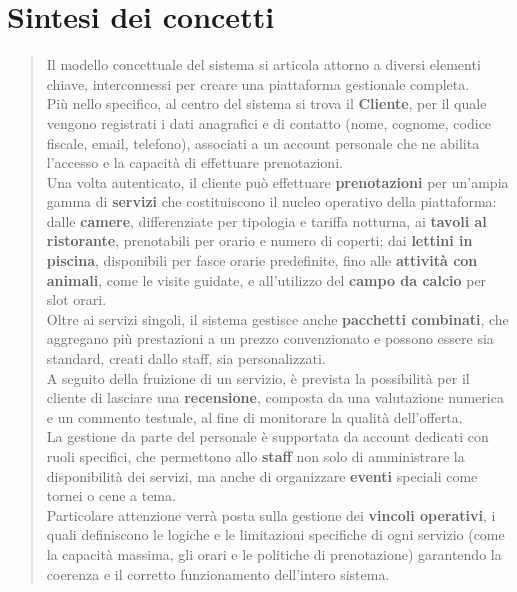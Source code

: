 \documentclass[a4paper,11pt]{report}
\begin{document}
\section{Sintesi dei concetti}
\begin{quote}
Il modello concettuale del sistema si articola attorno a diversi elementi chiave, interconnessi 
per creare una piattaforma gestionale completa. \\[6pt]
Più nello specifico, al centro del sistema si trova il \textbf{Cliente}, per il quale vengono registrati i dati anagrafici e di contatto 
(nome, cognome, codice fiscale, email, telefono), associati a un account personale che ne abilita l'accesso e 
la capacità di effettuare prenotazioni. \\[6pt]
Una volta autenticato, il cliente può effettuare \textbf{prenotazioni} per un'ampia gamma di \textbf{servizi} 
che costituiscono il nucleo operativo della piattaforma: dalle \textbf{camere}, differenziate per tipologia 
e tariffa notturna, ai \textbf{tavoli al ristorante}, prenotabili per orario e numero di coperti; 
dai \textbf{lettini in piscina}, disponibili per fasce orarie predefinite, fino alle \textbf{attività con animali}, 
come le visite guidate, e all'utilizzo del \textbf{campo da calcio} per slot orari. \\[6pt]
Oltre ai servizi singoli, il sistema gestisce anche \textbf{pacchetti combinati}, 
che aggregano più prestazioni a un prezzo convenzionato e possono essere sia standard, 
creati dallo staff, sia personalizzati. \\[6pt]
A seguito della fruizione di un servizio, è prevista la possibilità per il cliente di lasciare una \textbf{recensione},
composta da una valutazione numerica e un commento testuale, al fine di monitorare la qualità dell'offerta. \\[6pt]
La gestione da parte del personale è supportata da account dedicati con ruoli specifici,
che permettono allo \textbf{staff} non solo di amministrare la disponibilità dei servizi, 
ma anche di organizzare \textbf{eventi} speciali come tornei o cene a tema. \\[6pt]
Particolare attenzione verrà posta sulla gestione dei \textbf{vincoli operativi}, 
i quali definiscono le logiche e le limitazioni specifiche di ogni servizio (come la capacità massima, gli orari e le politiche di prenotazione) garantendo la coerenza e il corretto funzionamento dell'intero sistema.
\end{quote}
\end{document}
